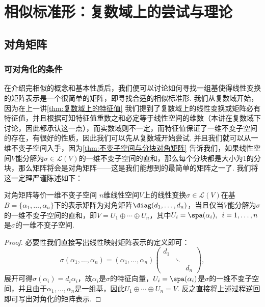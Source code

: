 \chapter{相似标准形：复数域上的尝试与理论}

\section{对角矩阵}
\subsection{可对角化的条件}

在介绍完相似的概念和基本性质后，我们便可以讨论如何寻找一组基使得线性变换的矩阵表示是一个很简单的矩阵，即寻找合适的相似标准形. 我们从复数域开始，因为在上一讲\autoref{thm:复数域上的特征值} 我们提到了复数域上的线性变换或矩阵必有特征值，并且根据可知特征值重数之和必定等于线性空间的维数（本讲在复数域下讨论，因此都承认这一点），而实数域则不一定，而特征值保证了一维不变子空间的存在，有很好的性质，因此我们可以先从复数域开始尝试. 并且我们就可以从一维不变子空间入手，因为\autoref{thm:不变子空间与分块对角矩阵} 告诉我们，如果线性空间$V$能分解为$\sigma\in\mathcal{L}(V)$的一维不变子空间的直和，那么每个分块都是大小为1的分块，那么矩阵将会是对角矩阵——这是我们能想到的最简单的矩阵之一了. 我们将这一定理严谨陈述如下：
\begin{theorem}{}{对角矩阵等价一维不变子空间}
    $n$维线性空间$V$上的线性变换$\sigma\in\mathcal{L}(V)$在基$B=\{\alpha_1,\ldots,\alpha_n\}$下的表示矩阵为对角矩阵$\diag(d_1,\ldots,d_n)$，当且仅当$V$能分解为$\sigma$的一维不变子空间的直和，即$V=U_1\oplus\cdots\oplus U_n$，其中$U_i=\spa(\alpha_i),\enspace i=1,\ldots,n$是$\sigma$的一维不变子空间.
\end{theorem}
\begin{proof}
    必要性我们直接写出线性映射矩阵表示的定义即可：
    \[\sigma(\alpha_1,\ldots,\alpha_n)=(\alpha_1,\ldots,\alpha_n)\begin{pmatrix}
            d_1 &        &     \\
                & \ddots &     \\
                &        & d_n
        \end{pmatrix},\]
    展开可得$\sigma(\alpha_i)=d_i\alpha_i$，故$\alpha_i$是$\sigma$的特征向量，$U_i=\spa(\alpha_i)$是$\sigma$的一维不变子空间，并且由于$\alpha_1,\ldots,\alpha_n$是一组基，因此$U_1\oplus\cdots\oplus U_n=V$. 反之直接将上述过程逆回即可写出对角化的矩阵表示.
\end{proof}

